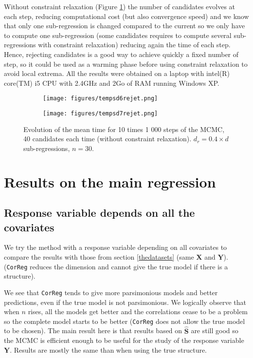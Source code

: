 \documentclass[12pt,a4paper]{report}
\begin{document}
 Without constraint relaxation (Figure \ref{tempsdrejet}) the number of candidates evolves at each step, reducing computational cost (but also convergence speed) and we know that only one sub-regression is changed compared to the current so we only have to compute one sub-regression (some candidates requires to compute several sub-regressions with constraint relaxation) reducing again the time of each step. Hence, rejecting candidates is a good way to achieve quickly a fixed number of step, so it could be used as a warming phase before using constraint relaxation to avoid local extrema. All the results were obtained on a laptop with intel(R) core(TM) i5 CPU with 2.4GHz and 2Go of RAM running Windows XP.
\begin{figure}[h]
\centering
	\begin{subfigure}
	\centering
		\texttt{[image: figures/tempsd6rejet.png]} 
	\end{subfigure}
	\begin{subfigure}
	\centering
		\texttt{[image: figures/tempsd7rejet.png]} 
	\end{subfigure}
	\caption{Evolution of the mean time for 10 times 1 000 steps of the MCMC, 40 candidates each time (without constraint relaxation). $d_r=0.4\times d$ sub-regressions, $n=30$.}\label{tempsdrejet}
\end{figure} 
  
\clearpage
\section{Results on the main regression}\label{compY}
\subsection{Response variable depends on all the covariates}	 \label{explsimtout}	
We try the method with a response variable depending on all covariates to compare the results with those from section \ref{thedatasets} (same $\boldsymbol{X}$ and $\boldsymbol{Y}$). ({\tt CorReg} reduces the dimension and cannot give the true model if there is a structure). %

 We see that {\tt CorReg} tends to give more parsimonious models and better predictions, even if the true model is not parsimonious. We logically observe that when $n$ rises, all the models get better and the correlations cease to be a problem so the complete model starts to be better ({\tt CorReg} does not allow the true model to be chosen). The main result here is that results based on $\hat{\boldsymbol{S}}$ are still good so the MCMC is efficient enough to be useful for the study of the response variable $\boldsymbol{Y}$. Results are mostly the same than when using the true structure.\\
 
\end{document}
